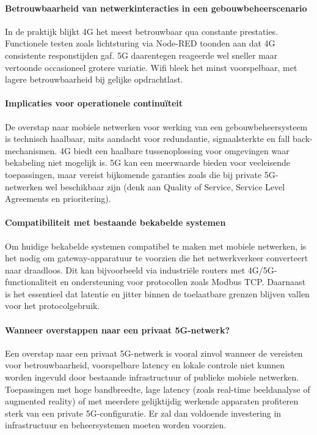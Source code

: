 \paragraph{Betrouwbaarheid van netwerkinteracties in een gebouwbeheerscenario}
In de praktijk blijkt 4G het meest betrouwbaar qua constante prestaties. Functionele testen zoals lichtsturing via Node-RED toonden aan dat 4G consistente responstijden gaf. 5G daarentegen reageerde wel sneller maar vertoonde occasioneel grotere variatie. Wifi bleek het minst voorspelbaar, met lagere betrouwbaarheid bij gelijke opdrachtlast.

\paragraph{Implicaties voor operationele continuïteit}
De overstap naar mobiele netwerken voor werking van een gebouwbeheersysteem is technisch haalbaar, mits aandacht voor redundantie, signaalsterkte en fall back-mechanismen. 4G biedt een haalbare tussenoplossing voor omgevingen waar bekabeling niet mogelijk is. 5G kan een meerwaarde bieden voor veeleisende toepassingen, maar vereist bijkomende garanties zoals die bij private 5G-netwerken wel beschikbaar zijn (denk aan Quality of Service, Service Level Agreements en prioritering).

\paragraph{Compatibiliteit met bestaande bekabelde systemen}
Om huidige bekabelde systemen compatibel te maken met mobiele netwerken, is het nodig om gateway-apparatuur te voorzien die het netwerkverkeer converteert naar draadloos. Dit kan bijvoorbeeld via industriële routers met 4G/5G-functionaliteit en ondersteuning voor protocollen zoals Modbus TCP. Daarnaast is het essentieel dat latentie en jitter binnen de toelaatbare grenzen blijven vallen voor het protocolgebruik.

\paragraph{Wanneer overstappen naar een privaat 5G-netwerk?}
Een overstap naar een privaat 5G-netwerk is vooral zinvol wanneer de vereisten voor betrouwbaarheid, voorspelbare latency en lokale controle niet kunnen worden ingevuld door bestaande infrastructuur of publieke mobiele netwerken. Toepassingen met hoge bandbreedte, lage latency (zoals real-time beeldanalyse of augmented reality) of met meerdere gelijktijdig werkende apparaten profiteren sterk van een private 5G-configuratie. Er zal dan voldoende investering in infrastructuur en beheersystemen moeten worden voorzien.


